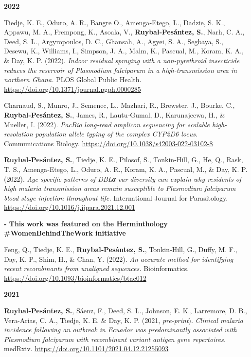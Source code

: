 \documentclass[11pt,a4paper,]{awesome-cv}
\begin{document}
\setlength{\leftskip}{0cm}

\textbf{2022}

\setlength{\leftskip}{1cm}

Tiedje, K. E., Oduro, A. R., Bangre O., Amenga‐Etego, L., Dadzie, S. K.,
Appawu, M. A., Frempong, K., Asoala, V., \textbf{Ruybal‐Pesántez, S.},
Narh, C. A., Deed, S. L., Argyropoulos, D. C., Ghansah, A., Agyei, S.
A., Segbaya, S., Desewu, K., Williams, I., Simpson, J. A., Malm, K.,
Pascual, M., Koram, K. A., \& Day, K. P. (2022). \emph{Indoor residual
spraying with a non-pyrethroid insecticide reduces the reservoir of
Plasmodium falciparum in a high-transmission area in northern Ghana.}
PLOS Global Public Health.
\url{https://doi.org/10.1371/journal.pgph.0000285}

Charnaud, S., Munro, J., Semenec, L., Mazhari, R., Brewster, J., Bourke,
C., \textbf{Ruybal‐Pesántez, S.}, James, R., Lautu‐Gumal, D.,
Karunajeewa, H., \& Mueller, I. (2022). \emph{PacBio long‐read amplicon
sequencing for scalable high‐resolution population allele typing of the
complex CYP2D6 locus}. Communications Biology.
\url{https://doi.org/10.1038/s42003-022-03102-8}

\textbf{Ruybal‐Pesántez, S.}, Tiedje, K. E., Pilosof, S., Tonkin‐Hill,
G., He, Q., Rask, T. S., Amenga‐Etego, L., Oduro, A. R., Koram, K. A.,
Pascual, M., \& Day, K. P. (2022). \emph{Age‐specific patterns of DBLα
var diversity can explain why residents of high malaria transmission
areas remain susceptible to Plasmodium falciparum blood stage infection
throughout life.} International Journal for Parasitology.
\url{https://doi.org/10.1016/j.ijpara.2021.12.001}

\setlength{\leftskip}{2cm}

\textbf{- This work was featured on the Herminthology
\#WomenBehindTheWork initiative
\href{https://facebook.com/102760015458811/posts/151514423916703/?d=n}{\faExternalLink}}

\setlength{\leftskip}{1cm}

Feng, Q., Tiedje, K. E., \textbf{Ruybal‐Pesántez, S.}, Tonkin‐Hill, G.,
Duffy, M. F., Day, K. P., Shim, H., \& Chan, Y. (2022). \emph{An
accurate method for identifying recent recombinants from unaligned
sequences.} Bioinformatics.
\url{https://doi.org/10.1093/bioinformatics/btac012}

\setlength{\leftskip}{0cm}

\textbf{2021}

\setlength{\leftskip}{1cm}

\textbf{Ruybal‐Pesántez, S.}, Sáenz, F., Deed, S. L., Johnson, E. K.,
Larremore, D. B., Vera-Arias, C. A., Tiedje, K. E. \& Day, K. P. (2021,
\emph{pre-print}). \emph{Clinical malaria incidence following an
outbreak in Ecuador was predominantly associated with Plasmodium
falciparum with recombinant variant antigen gene repertoires.} medRxiv.
\url{https://doi.org/10.1101/2021.04.12.21255093}
\end{document}
